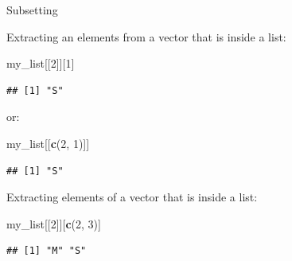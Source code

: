\documentclass[ignorenonframetext,]{beamer}
\newenvironment{Shaded}{\begin{snugshade}}{\end{snugshade}}
\newcommand{\DecValTok}[1]{\textcolor[rgb]{0.00,0.00,0.81}{#1}}
\newcommand{\KeywordTok}[1]{\textcolor[rgb]{0.13,0.29,0.53}{\textbf{#1}}}
\newcommand{\NormalTok}[1]{#1}
\begin{document}
\begin{frame}[fragile]{Subsetting}
\protect\hypertarget{subsetting-8}{}

Extracting an elements from a vector that is inside a list:

\begin{Shaded}
\begin{Highlighting}[]
\NormalTok{my_list[[}\DecValTok{2}\NormalTok{]][}\DecValTok{1}\NormalTok{]}
\end{Highlighting}
\end{Shaded}

\begin{verbatim}
## [1] "S"
\end{verbatim}

or:

\begin{Shaded}
\begin{Highlighting}[]
\NormalTok{my_list[[}\KeywordTok{c}\NormalTok{(}\DecValTok{2}\NormalTok{, }\DecValTok{1}\NormalTok{)]]}
\end{Highlighting}
\end{Shaded}

\begin{verbatim}
## [1] "S"
\end{verbatim}

Extracting elements of a vector that is inside a list:

\begin{Shaded}
\begin{Highlighting}[]
\NormalTok{my_list[[}\DecValTok{2}\NormalTok{]][}\KeywordTok{c}\NormalTok{(}\DecValTok{2}\NormalTok{, }\DecValTok{3}\NormalTok{)]}
\end{Highlighting}
\end{Shaded}

\begin{verbatim}
## [1] "M" "S"
\end{verbatim}

\end{frame}
\end{document}
